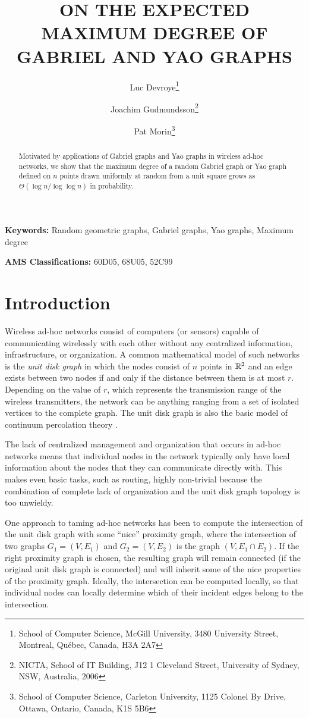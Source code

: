 \documentclass[lotsofwhite,charterfonts]{patmorin}
\title{\MakeUppercase{On the Expected Maximum Degree 
	of Gabriel and Yao Graphs}}
\author{Luc Devroye\thanks{School of Computer Science, McGill University,
3480 University Street,
Montreal, Qu\'ebec, Canada, H3A 2A7}
	\and Joachim Gudmundsson\thanks{NICTA, School of IT Building, J12 1
Cleveland Street, University of Sydney, NSW, Australia, 2006}
	\and Pat Morin\thanks{School of Computer Science, Carleton
University, 1125 Colonel By Drive, Ottawa, Ontario, Canada, K1S 5B6}}
\begin{document}
\maketitle
\begin{abstract}
Motivated by applications of Gabriel graphs and Yao graphs in wireless
ad-hoc networks, we show that the maximum degree of a random Gabriel
graph or Yao graph defined on $n$ points drawn uniformly at random from
a unit square  grows as $\Theta ( \log n / \log \log n)$ in probability.
\end{abstract}

\noindent\textbf{Keywords:}
Random geometric graphs, Gabriel graphs, Yao graphs, Maximum degree

\noindent\textbf{AMS Classifications:} 60D05, 68U05, 52C99


\section{Introduction}

Wireless ad-hoc networks consist of computers (or sensors) capable of
communicating wirelessly with each other without any centralized
information, infrastructure, or organization.  A common mathematical model
of such networks is the \emph{unit disk graph} in which the nodes consist
of $n$ points in $\mathbb{R}^2$ and an edge exists between two nodes if and only if
the distance between them is at most $r$.  Depending on the value of $r$,
which represents the transmission range of the wireless transmitters, the
network can be anything ranging from a set of isolated vertices to the
complete graph.  The unit disk graph is also the basic model of continuum percolation theory \cite{mr96}.

The lack of centralized management and organization that occurs in ad-hoc
networks means that individual nodes in the network typically only have
local information about the nodes that they can communicate directly with.
This makes even basic tasks, such as routing, highly non-trivial because
the combination of complete lack of organization and the unit disk graph
topology is too unwieldy.

One approach to taming ad-hoc networks has been to compute the
intersection of the unit disk graph with some ``nice'' proximity graph,
where the intersection of two graphs $G_1=(V,E_1)$ and $G_2=(V,E_2)$ is
the graph $(V,E_1\cap E_2)$.  If the right proximity graph is chosen,
the resulting graph will remain connected (if the original unit disk
graph is connected) and will inherit some of the nice properties of the
proximity graph.   Ideally, the intersection can be computed locally,
so that individual nodes can locally determine which of their incident
edges belong to the intersection.
\end{document}
